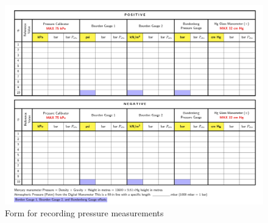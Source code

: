 \documentclass{article}
\begin{document}
	\begin{figure}[H] 
			\centering 
			\includegraphics[width=1\textwidth,cfbox=gray!15 1pt]{images/tableland-1_page-0001.jpg} 
			\caption{Form for recording pressure measurements} 
			\label{fig:pressurestable} 
	\end{figure}
	
\end{document}
